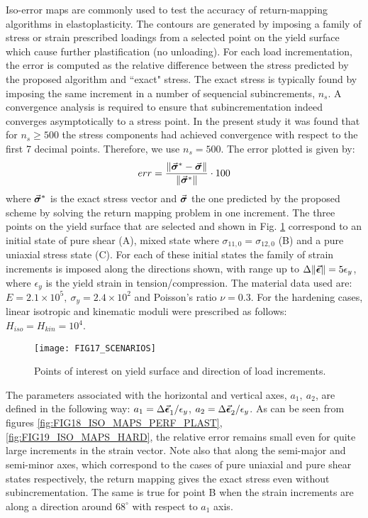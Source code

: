 Iso-error maps are commonly used to test the accuracy of return-mapping 
algorithms in elastoplasticity\cite{DeSouza2011}. The contours are generated by 
imposing a family of stress or strain prescribed loadings from a selected point 
on the yield surface which cause further plastification (no unloading). For 
each load incrementation, the error is computed as the relative difference 
between the stress predicted by the proposed algorithm and ``exact" stress. 
The exact stress is typically found by imposing the same increment in a number 
of sequencial subincrements, $n_s$. A convergence analysis is required to 
ensure that subincrementation indeed converges asymptotically to a stress 
point. In the 
present study it was found that for $n_s\geq 500$ the stress components had 
achieved convergence with respect to the first 7 decimal points. Therefore, we 
use $n_s = 500$. The error plotted is given by:
\begin{equation}
	err = \frac{\Vert 
		\vec{\bm{\sigma}}^*-\vec{\bm{\sigma}}\Vert}{\Vert\vec{\bm{\sigma}}^*\Vert}\cdot 100
	\label{eq:ERROR}
\end{equation}
\noindent where $\vec{\bm{\sigma}}^*$ is the exact stress vector and 
$\vec{\bm{\sigma}}$ the one predicted by the proposed scheme by solving the return 
mapping problem in one 
increment. The three points on the yield surface that are selected and shown
in Fig. \ref{fig:FIG17_ISO_MAP_SCENARIOS} correspond to an initial state of 
pure shear (A), mixed 
state where $\sigma_{11,0}=\sigma_{12,0}$ (B) and a pure uniaxial stress state 
(C). 
For each of these initial states the family of strain increments is imposed 
along the directions shown, with range up to 
$\Delta\Vert\vec{\bm{\epsilon}}\Vert=5\epsilon_y$, where $\epsilon_y$ is the yield 
strain in tension/compression. The material data used are: $E=2.1\times 10^5,\ 
\sigma_y = 2.4\times 10^2$ and Poisson's ratio $\nu=0.3$. For the hardening 
cases, linear isotropic and 
kinematic moduli were prescribed as follows: $H_{iso}=H_{kin} = 10^4$.

\begin{figure}[t]
	\centering
	\texttt{[image: FIG17\_SCENARIOS]}
	\caption{Points of interest on yield surface and direction of load 
		increments.}
	\label{fig:FIG17_ISO_MAP_SCENARIOS}
\end{figure}

The parameters associated with the horizontal and vertical axes, $a_1,\ a_2$, 
are defined in the following way: $a_1=\Delta\vec{\bm{\epsilon}}_1^{}/\epsilon_y$, 
$a_2=\Delta\vec{\bm{\epsilon}}_2^{}/\epsilon_y$. As  can be seen from figures 
\ref{fig:FIG18_ISO_MAPS_PERF_PLAST}, \ref{fig:FIG19_ISO_MAPS_HARD}, the 
relative error 
remains small even for quite large increments in the strain vector. Note also 
that along the semi-major and semi-minor axes, which correspond to the cases of 
pure uniaxial and pure shear states respectively, the return mapping gives the 
exact stress 
even without subincrementation. The same is true for point B when the strain 
increments are along a direction around $68^{\circ}$ with respect to $a_1$ axis.


